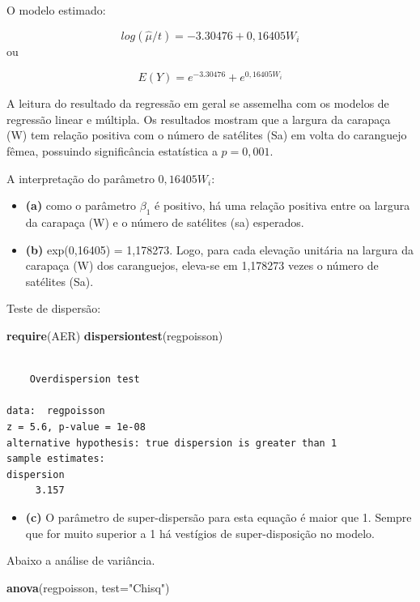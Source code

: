 \documentclass[12pt,brazil,oneside]{book}
\newenvironment{Shaded}{\begin{snugshade}}{\end{snugshade}}
\newcommand{\DataTypeTok}[1]{\textcolor[rgb]{0.13,0.29,0.53}{#1}}
\newcommand{\KeywordTok}[1]{\textcolor[rgb]{0.13,0.29,0.53}{\textbf{#1}}}
\newcommand{\NormalTok}[1]{#1}
\newcommand{\StringTok}[1]{\textcolor[rgb]{0.31,0.60,0.02}{#1}}
\providecommand{\tightlist}{%
  \setlength{\itemsep}{0pt}\setlength{\parskip}{0pt}}
\begin{document}
O modelo estimado:

\[
log(\hat\mu {/t}) = -3.30476 + 0,16405 W_i
\]
ou

\[
E(Y)= e^{-3.30476} + e^{0,16405 W_i}
\]

A leitura do resultado da regressão em geral se assemelha com os modelos de regressão linear e múltipla. Os resultados mostram que a largura da carapaça (W) tem relação positiva com o número de satélites (Sa) em volta do caranguejo fêmea, possuindo significância estatística a \(p=0,001\).

A interpretação do parâmetro \(0,16405W_i\):

\begin{itemize}
\item
  \textbf{(a)} como o parâmetro \(\beta_1\) é positivo, há uma relação positiva entre oa largura da carapaça (W) e o número de satélites (sa) esperados.
\item
  \textbf{(b)} exp(0,16405) = 1,178273. Logo, para cada elevação unitária na largura da carapaça (W) dos caranguejos, eleva-se em 1,178273 vezes o número de satélites (Sa).
\end{itemize}

Teste de dispersão:

\begin{Shaded}
\begin{Highlighting}[]
\KeywordTok{require}\NormalTok{(AER)}
\KeywordTok{dispersiontest}\NormalTok{(regpoisson)}
\end{Highlighting}
\end{Shaded}

\begin{verbatim}

    Overdispersion test

data:  regpoisson
z = 5.6, p-value = 1e-08
alternative hypothesis: true dispersion is greater than 1
sample estimates:
dispersion 
     3.157 
\end{verbatim}

\begin{itemize}
\tightlist
\item
  \textbf{(c)} O parâmetro de super-dispersão para esta equação é maior que 1. Sempre que for muito superior a 1 há vestígios de super-disposição no modelo.
\end{itemize}

Abaixo a análise de variância.

\begin{Shaded}
\begin{Highlighting}[]
\KeywordTok{anova}\NormalTok{(regpoisson, }\DataTypeTok{test=}\StringTok{"Chisq"}\NormalTok{)}
\end{Highlighting}
\end{Shaded}
\end{document}
